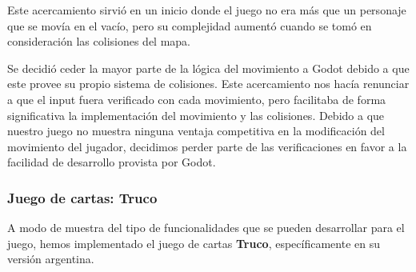 Este acercamiento sirvió en un inicio donde el juego no era más que un personaje que se movía en 
el vacío, pero su complejidad aumentó cuando se tomó en consideración las colisiones del mapa.

Se decidió ceder la mayor parte de la lógica del movimiento a Godot debido a que este provee 
su propio sistema de colisiones. Este acercamiento nos hacía renunciar a que el input fuera 
verificado con cada movimiento, pero facilitaba de forma significativa la implementación del 
movimiento y las colisiones. Debido a que nuestro juego no muestra ninguna ventaja competitiva 
en la modificación del movimiento del jugador, decidimos perder parte de las verificaciones en 
favor a la facilidad de desarrollo provista por Godot.



\subsubsection{Juego de cartas: Truco}
\noindent A modo de muestra del tipo de funcionalidades que se pueden desarrollar para el juego, hemos implementado 
el juego de cartas \textbf{Truco}, específicamente en su versión argentina.